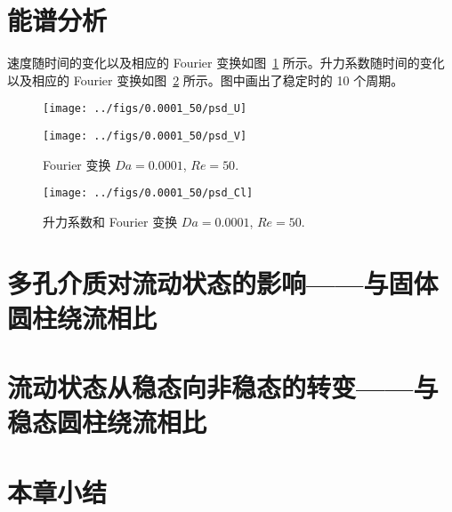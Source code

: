 \section{能谱分析} %

速度随时间的变化以及相应的 Fourier 变换如图~\ref{fig: velocity Fourier} 所示。升力系数随时间的变化以及相应的 Fourier 变换如图~\ref{fig: Cl Fourier} 所示。图中画出了稳定时的 10 个周期。

\begin{figure}
	\centering
	\begin{minipage}{\textwidth}
		\centering
		\texttt{[image: ../figs/0.0001\_50/psd\_U]}
	\end{minipage}
	\centering
	\begin{minipage}{\textwidth}
		\centering
		\texttt{[image: ../figs/0.0001\_50/psd\_V]}
	\end{minipage}
	\caption{Fourier 变换 $Da=0.0001$, $Re=50$.}
	\label{fig: velocity Fourier}
\end{figure}

\begin{figure}
	\centering
	\texttt{[image: ../figs/0.0001\_50/psd\_Cl]}
	\caption{升力系数和 Fourier 变换 $Da=0.0001$, $Re=50$.}
	\label{fig: Cl Fourier}
\end{figure}

\section{多孔介质对流动状态的影响——与固体圆柱绕流相比}

\section{流动状态从稳态向非稳态的转变——与稳态圆柱绕流相比}

\section{本章小结}
